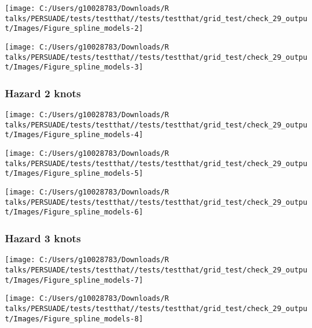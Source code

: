 \documentclass[
]{article}
\begin{document}
\begin{flushleft}\texttt{[image: C:/Users/g10028783/Downloads/R talks/PERSUADE/tests/testthat//tests/testthat/grid\_test/check\_29\_output/Images/Figure\_spline\_models-2]} \end{flushleft}

\begin{flushleft}\texttt{[image: C:/Users/g10028783/Downloads/R talks/PERSUADE/tests/testthat//tests/testthat/grid\_test/check\_29\_output/Images/Figure\_spline\_models-3]} \end{flushleft}

\clearpage

\subsubsection{Hazard 2 knots}\label{hazard-2-knots}

\begin{flushleft}\texttt{[image: C:/Users/g10028783/Downloads/R talks/PERSUADE/tests/testthat//tests/testthat/grid\_test/check\_29\_output/Images/Figure\_spline\_models-4]} \end{flushleft}

\begin{flushleft}\texttt{[image: C:/Users/g10028783/Downloads/R talks/PERSUADE/tests/testthat//tests/testthat/grid\_test/check\_29\_output/Images/Figure\_spline\_models-5]} \end{flushleft}

\begin{flushleft}\texttt{[image: C:/Users/g10028783/Downloads/R talks/PERSUADE/tests/testthat//tests/testthat/grid\_test/check\_29\_output/Images/Figure\_spline\_models-6]} \end{flushleft}

\clearpage

\subsubsection{Hazard 3 knots}\label{hazard-3-knots}

\begin{flushleft}\texttt{[image: C:/Users/g10028783/Downloads/R talks/PERSUADE/tests/testthat//tests/testthat/grid\_test/check\_29\_output/Images/Figure\_spline\_models-7]} \end{flushleft}

\begin{flushleft}\texttt{[image: C:/Users/g10028783/Downloads/R talks/PERSUADE/tests/testthat//tests/testthat/grid\_test/check\_29\_output/Images/Figure\_spline\_models-8]} \end{flushleft}
\end{document}
